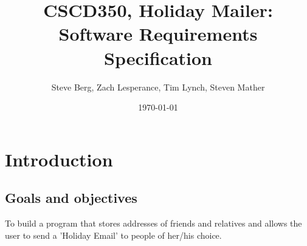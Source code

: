 \documentclass{article}
\title{CSCD350, Holiday Mailer: Software Requirements Specification}
\author{Steve Berg, Zach Lesperance, Tim Lynch, Steven Mather}
\date{\today}
\begin{document}
\maketitle{}
\pagebreak

\section{Introduction}

\subsection{Goals and objectives}
To build a program that stores addresses of friends and relatives and allows the user to send a 'Holiday Email' to people of her/his choice.





\end{document}
